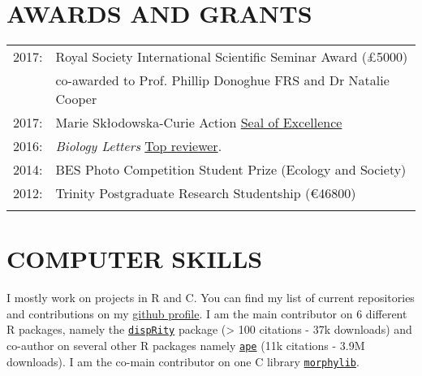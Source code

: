 \documentclass[10pt,a4paper]{article}
\begin{document}
{\bigskip




\section{AWARDS AND GRANTS}
\begin{tabular}{ll}
2017: & Royal Society International Scientific Seminar Award (\pounds5000)\\
      & co-awarded to Prof. Phillip Donoghue FRS and Dr Natalie Cooper\\
2017: & Marie Sk\l{}odowska-Curie Action \href{https://ec.europa.eu/research/soe/index.cfm?pg=what}{Seal of Excellence}\\
2016: & \textit{Biology Letters} \href{http://blogs.royalsociety.org/publishing/biology-letters-top-reviewers-from-2016/}{Top reviewer}.\\
2014: & BES Photo Competition Student Prize (Ecology and Society)\\
2012: & Trinity Postgraduate Research Studentship (\euro46800)\\
& \\ 
\end{tabular}
\bigskip


\section{COMPUTER SKILLS}

I mostly work on projects in R and C. You can find my list of current repositories and contributions on my \href{https://github.com/tguillerme}{github profile}. I am the main contributor on 6 different R packages, namely the \href{https://github.com/tguillerme/dispRity}{\texttt{dispRity}} package (> 100 citations - 37k downloads) and co-author on several other R packages namely \href{https://github.com/emmanuelparadis/ape}{\texttt{ape}} (11k citations - 3.9M downloads). I am the co-main contributor on one C library \href{https://github.com/mbrazeau/morphylib}{\texttt{morphylib}}.

}
\end{document}
